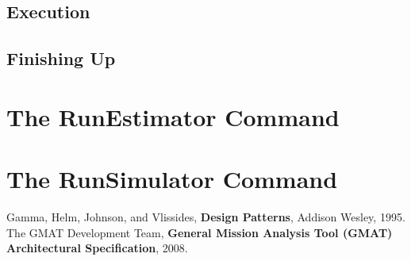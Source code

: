 \documentclass[10pt]{article}
\begin{document}
\subsection{Execution}

\subsection{Finishing Up}

\section{The RunEstimator Command}

\section{The RunSimulator Command}

\begin{thebibliography}{99}

 Gamma, Helm, Johnson, and Vlissides, \textbf{Design Patterns}, Addison Wesley, 1995.
 The GMAT Development Team, \textbf{General Mission Analysis Tool (GMAT) Architectural Specification}, 2008.

\end{thebibliography}
\end{document}
